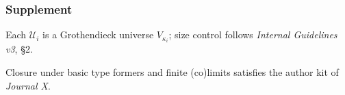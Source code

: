 \documentclass[a4paper,11pt]{article}
\begin{document}
\newpage
\subsubsection*{Supplement}
\begin{description}[style=nextline,leftmargin=2.8em,labelsep=0.6em]

  \item[HC\,1–2]
    Each $\mathcal U_{i}$ is a Grothendieck universe
    $V_{\kappa_{i}}$; size control follows \emph{Internal
    Guidelines v3}, §2.

  \item[J01–J03]
    Closure under basic type formers and finite (co)limits
    satisfies the author kit of \emph{Journal X}.

  \item[Dependency Graph]
    \begin{center}
    \end{center}

\end{description}

\end{document}
